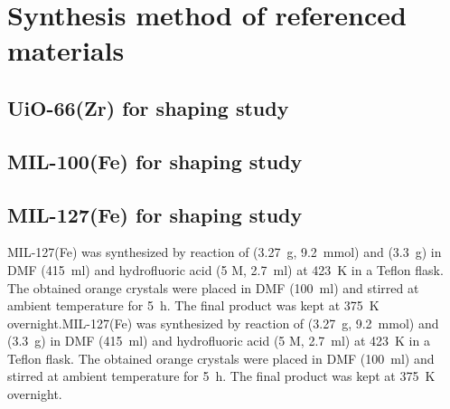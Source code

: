
\graphicspath{ {\thisappx/figures/} }

\chapter{Synthesis method of referenced materials}

\section{UiO-66(Zr) for shaping study}

\section{MIL-100(Fe) for shaping study}

\section{MIL-127(Fe)  for shaping study}

MIL-127(Fe) was synthesized by reaction of
 (\SI{3.27}{\gram}, \SI{9.2}{\milli\mol}) and 
 (\SI{3.3}{\gram}) in DMF
(\SI{415}{\milli\litre}) and hydrofluoric acid (5 M, \SI{2.7}{\milli\litre}) at 
\SI{423}{\kelvin} in a Teflon
flask. The obtained orange crystals were placed in DMF (\SI{100}{\milli\litre})
and stirred at ambient temperature for \SI{5}{\hour}. The final product was
kept at \SI{375}{\kelvin} overnight.MIL-127(Fe) was synthesized by reaction of
 (\SI{3.27}{\gram}, \SI{9.2}{\milli\mol}) and 
 (\SI{3.3}{\gram}) in DMF
(\SI{415}{\milli\litre}) and hydrofluoric acid (5 M, \SI{2.7}{\milli\litre}) at 
\SI{423}{\kelvin} in a Teflon 
flask. The obtained orange crystals were placed in DMF (\SI{100}{\milli\litre})
and stirred at ambient temperature for \SI{5}{\hour}. The final product was
kept at \SI{375}{\kelvin} overnight.